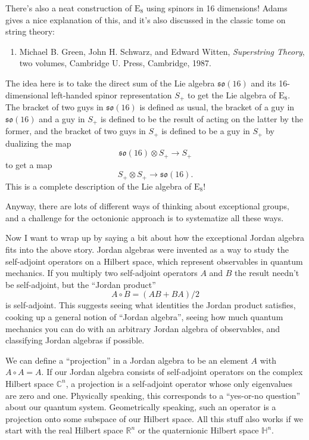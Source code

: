 \documentclass{article}
\def\tightlist{}
\begin{document}
There's also a neat construction of \(\mathrm{E}_8\) using spinors in 16
dimensions! Adams gives a nice explanation of this, and it's also
discussed in the classic tome on string theory:

\begin{enumerate}
\def\labelenumi{\arabic{enumi})}
\setcounter{enumi}{2}
\tightlist
\item
  Michael B. Green, John H. Schwarz, and Edward Witten,
  \emph{Superstring Theory}, two volumes, Cambridge U. Press, Cambridge,
  1987.
\end{enumerate}

The idea here is to take the direct sum of the Lie algebra
\(\mathfrak{so}(16)\) and its 16-dimensional left-handed spinor
representation \(S_+\) to get the Lie algebra of \(\mathrm{E}_8\). The
bracket of two guys in \(\mathfrak{so}(16)\) is defined as usual, the
bracket of a guy in \(\mathfrak{so}(16)\) and a guy in \(S_+\) is
defined to be the result of acting on the latter by the former, and the
bracket of two guys in \(S_+\) is defined to be a guy in \(S_+\) by
dualizing the map \[\mathfrak{so}(16) \otimes S_+\to S_+\] to get a map
\[S_+ \otimes S_+\to \mathfrak{so}(16).\] This is a complete description
of the Lie algebra of \(\mathrm{E}_8\)!

Anyway, there are lots of different ways of thinking about exceptional
groups, and a challenge for the octonionic approach is to systematize
all these ways.

Now I want to wrap up by saying a bit about how the exceptional Jordan
algebra fits into the above story. Jordan algebras were invented as a
way to study the self-adjoint operators on a Hilbert space, which
represent observables in quantum mechanics. If you multiply two
self-adjoint operators \(A\) and \(B\) the result needn't be
self-adjoint, but the ``Jordan product'' \[A \circ B = (AB + BA)/2\] is
self-adjoint. This suggests seeing what identities the Jordan product
satisfies, cooking up a general notion of ``Jordan algebra'', seeing how
much quantum mechanics you can do with an arbitrary Jordan algebra of
observables, and classifying Jordan algebras if possible.

We can define a ``projection'' in a Jordan algebra to be an element
\(A\) with \(A \circ A = A\). If our Jordan algebra consists of
self-adjoint operators on the complex Hilbert space \(\mathbb{C}^n\), a
projection is a self-adjoint operator whose only eigenvalues are zero
and one. Physically speaking, this corresponds to a ``yes-or-no
question'' about our quantum system. Geometrically speaking, such an
operator is a projection onto some subspace of our Hilbert space. All
this stuff also works if we start with the real Hilbert space
\(\mathbb{R}^n\) or the quaternionic Hilbert space \(\mathbb{H}^n\).
\end{document}
